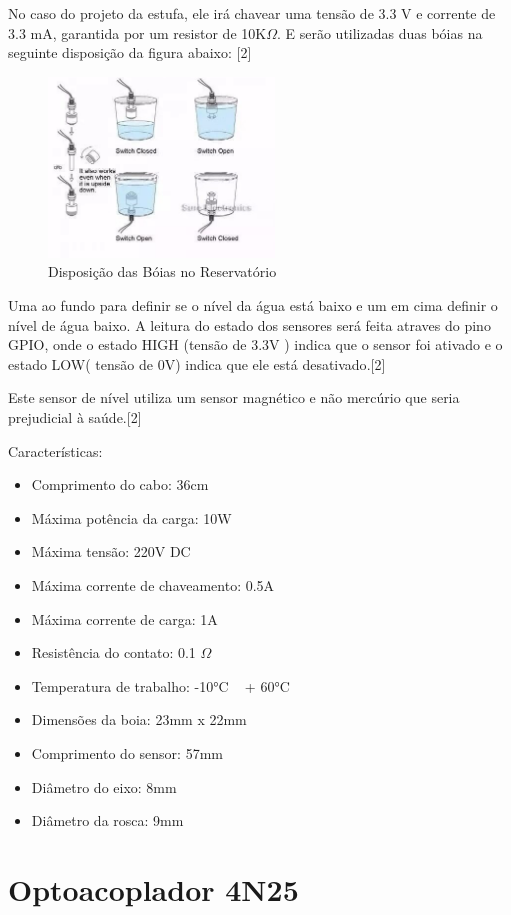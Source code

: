 No caso do projeto da estufa, ele irá chavear uma tensão de 3.3 V e corrente de 3.3 mA, garantida por um resistor de 10K$\Omega$. E serão utilizadas duas bóias na seguinte disposição da figura abaixo: \cite{eicos}[2]

\begin{figure}[H]
	\centering
	\includegraphics[width=6cm]{figuras/eletronica_1.png}
	\caption{Disposição das Bóias no Reservatório} \label{eletronica_1}
\end{figure}

Uma ao fundo para definir se o nível da água está baixo e um em cima definir o nível de água baixo.  A leitura do estado dos sensores será feita atraves do pino GPIO, onde o estado HIGH (tensão de 3.3V ) indica que o sensor foi ativado e o estado LOW( tensão de 0V) indica que ele está desativado\cite{eicos}.[2]

Este sensor de nível utiliza um sensor magnético e não mercúrio que seria prejudicial à saúde\cite{eicos}.[2]

Características:

\begin{itemize}
	\item Comprimento do cabo: 36cm
	\item Máxima potência da carga: 10W
	\item Máxima tensão: 220V DC
	\item Máxima corrente de chaveamento: 0.5A
	\item Máxima corrente de carga: 1A
	\item Resistência do contato: 0.1 $\Omega$
	\item Temperatura de trabalho: -10°C ~ + 60°C
	\item Dimensões da boia: 23mm x 22mm
	\item Comprimento do sensor: 57mm
	\item Diâmetro do eixo: 8mm
	\item Diâmetro da rosca: 9mm
\end{itemize}

\section{Optoacoplador 4N25}

